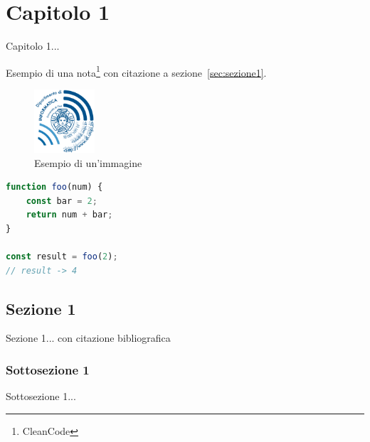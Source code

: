 \chapter{Capitolo 1}
\label{ch:capitolo1}


Capitolo 1...

Esempio di una nota\footnote{CleanCode} con citazione a sezione~\ref{sec:sezione1}.

\begin{figure}[H]
    \centering
    \includegraphics[width=0.2\textwidth]{immagini/logo-dip_blu_hr.png}
    \caption{Esempio di un'immagine}
    \label{fig:immagine1}
\end{figure}

\begin{lstlisting}[caption={Esempio codice JavaScript},label={Esempio codice JavaScript}, language=JavaScript]
function foo(num) {
    const bar = 2;
    return num + bar;
}

const result = foo(2);
// result -> 4
\end{lstlisting}


\section{Sezione 1\label{sec:sezione1}}


Sezione 1... con citazione bibliografica~\cite{CleanCode}

\subsection{Sottosezione 1}
\label{subsec:sottosezione1}

Sottosezione 1...